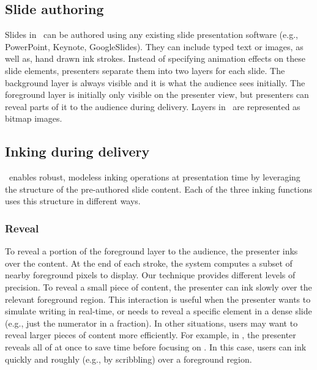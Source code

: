 \subsection{Slide authoring}
Slides in \interface\ can be authored using any existing slide presentation software (e.g., PowerPoint, Keynote, GoogleSlides). They can include typed text or images, as well as, hand drawn ink strokes. Instead of specifying animation effects on these slide elements, presenters separate them into two layers for each slide. The background layer is always visible and it is what the audience sees initially. The foreground layer is initially only visible on the presenter view, but presenters can reveal parts of it to the audience during delivery.  Layers in \interface\ are represented as bitmap images. 

\subsection{Inking during delivery}
%
\interface\ enables robust, modeless inking operations at presentation time by leveraging the structure of the pre-authored slide content. Each of the three inking functions uses this structure in different ways. 

\subsubsection{Reveal}
To reveal a portion of the foreground layer to the audience, the presenter inks over the content. At the end of each stroke, the system computes a subset of nearby foreground pixels to display. Our technique provides different levels of precision. To reveal a small piece of content, the presenter can ink slowly over the relevant foreground region. This interaction is useful when the presenter wants to simulate writing in real-time, or needs to reveal a specific element in a dense slide (e.g., just the numerator in a fraction). 
%
In other situations, users may want to reveal larger pieces of content more efficiently. For example, in , the presenter reveals all of  at once to save time before focusing on . In this case, users can ink quickly and roughly (e.g., by scribbling) over a foreground region.

